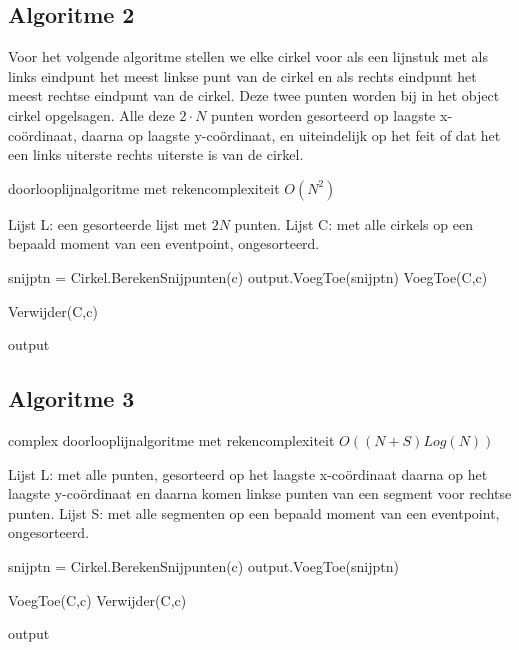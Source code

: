\documentclass[11pt,a4paper]{article}
\begin{document}
\subsection{Algoritme 2}
Voor het volgende algoritme stellen we elke cirkel voor als een lijnstuk met als links eindpunt het meest linkse punt van de cirkel en als rechts eindpunt het meest rechtse eindpunt van de cirkel. Deze twee punten worden bij in het object cirkel opgelsagen. Alle deze $2\cdot N$ punten worden gesorteerd op laagste x-coördinaat, daarna op laagste y-coördinaat, en uiteindelijk op het feit of dat het een links uiterste rechts uiterste is van de cirkel.
\begin{algorithm}
\caption{doorlooplijnalgoritme met rekencomplexiteit $O(N^2)$}
\begin{algorithmic}
\State Lijst L: een gesorteerde lijst met $2N$ punten.
\State Lijst C: met alle cirkels op een bepaald moment van een eventpoint, ongesorteerd.


	
		\State snijptn = Cirkel.BerekenSnijpunten(c)
		\State output.VoegToe(snijptn)	
		\State VoegToe(C,c)
		
	\EndIf
		\State Verwijder(C,c)
	\EndIf
\EndFor

\Return output
\end{algorithmic}
\end{algorithm}

\subsection{Algoritme 3}
\begin{algorithm}
\caption{complex doorlooplijnalgoritme met rekencomplexiteit $O((N+S)Log(N))$}
\begin{algorithmic}
\State Lijst L: met alle punten, gesorteerd op het laagste x-co\"ordinaat daarna op het laagste y-co\"ordinaat en daarna komen linkse punten van een segment voor rechtse punten.
\State Lijst S: met alle segmenten op een bepaald moment van een eventpoint, ongesorteerd.
	
		\State snijptn = Cirkel.BerekenSnijpunten(c)
		\State output.VoegToe(snijptn)
	
	\State VoegToe(C,c)
	\EndIf
	\State Verwijder(C,c)
	\EndIf
\EndFor

\Return output
\end{algorithmic}
\end{algorithm}
\end{document}
